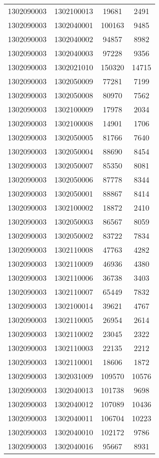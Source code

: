 \begin{longtable}{llcc}
1302090003 & 1302100013 & 19681 & 2491\\
1302090003 & 1302040001 & 100163 & 9485\\
1302090003 & 1302040002 & 94857 & 8982\\
1302090003 & 1302040003 & 97228 & 9356\\
1302090003 & 1302021010 & 150320 & 14715\\
1302090003 & 1302050009 & 77281 & 7199\\
1302090003 & 1302050008 & 80970 & 7562\\
1302090003 & 1302100009 & 17978 & 2034\\
1302090003 & 1302100008 & 14901 & 1706\\
1302090003 & 1302050005 & 81766 & 7640\\
1302090003 & 1302050004 & 88690 & 8454\\
1302090003 & 1302050007 & 85350 & 8081\\
1302090003 & 1302050006 & 87778 & 8344\\
1302090003 & 1302050001 & 88867 & 8414\\
1302090003 & 1302100002 & 18872 & 2410\\
1302090003 & 1302050003 & 86567 & 8059\\
1302090003 & 1302050002 & 83722 & 7834\\
1302090003 & 1302110008 & 47763 & 4282\\
1302090003 & 1302110009 & 46936 & 4380\\
1302090003 & 1302110006 & 36738 & 3403\\
1302090003 & 1302110007 & 65449 & 7832\\
1302090003 & 1302100014 & 39621 & 4767\\
1302090003 & 1302110005 & 26954 & 2614\\
1302090003 & 1302110002 & 23045 & 2322\\
1302090003 & 1302110003 & 22135 & 2212\\
1302090003 & 1302110001 & 18606 & 1872\\
1302090003 & 1302031009 & 109570 & 10576\\
1302090003 & 1302040013 & 101738 & 9698\\
1302090003 & 1302040012 & 107089 & 10436\\
1302090003 & 1302040011 & 106704 & 10223\\
1302090003 & 1302040010 & 102172 & 9786\\
1302090003 & 1302040016 & 95667 & 8931\\

\end{longtable}
